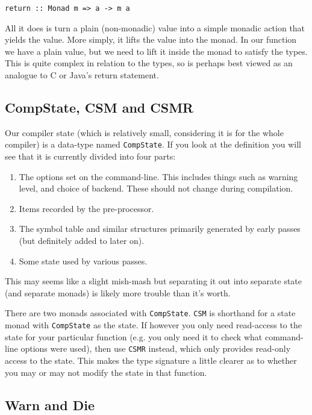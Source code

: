\documentclass[a4wide]{article}
\begin{document}
\begin{lstlisting}
return :: Monad m => a -> m a
\end{lstlisting}

All it does is turn a plain (non-monadic) value into a simple monadic action that yields the value.  More
simply, it lifts the value into the monad.  In our function we have a plain value, but we need to lift it
inside the monad to satisfy the types.  This is quite complex in relation to the types, so is perhaps best
viewed as an analogue to C or Java's return statement.

\subsection{CompState, CSM and CSMR}

Our compiler state (which is relatively small, considering it is for the whole compiler) is a data-type
named \lstinline|CompState|.  If you look at the definition you will see that it is currently divided into
four parts:

\begin{enumerate}
\item The options set on the command-line.  This includes things such as warning level, and choice of backend.
These should not change during compilation.
\item Items recorded by the pre-processor.
\item The symbol table and similar structures primarily generated by early passes (but definitely added to later on).
\item Some state used by various passes.
\end{enumerate}

This may seems like a slight mish-mash but separating it out into separate state (and separate monads) is likely more
trouble than it's worth.  

There are two monads associated with \lstinline|CompState|. \lstinline|CSM| is shorthand for a state monad with \lstinline|CompState|
as the state.  If however you only need read-access to the state for your particular function (e.g. you only
need it to check what command-line options were used), then use \lstinline|CSMR| instead, which only provides
read-only access to the state.  This makes the type signature a little clearer as to whether you may or may not
modify the state in that function.

\subsection{Warn and Die}
\end{document}

